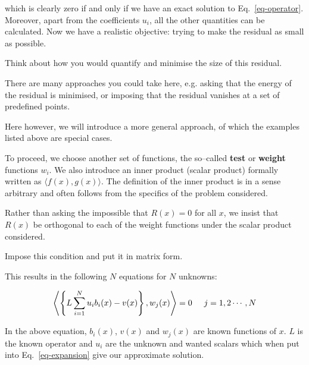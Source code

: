which is clearly zero if and only if we have an exact solution to Eq.~\ref{eq-operator}. Moreover, apart from the coefficients $u_i$, all the other quantities can be calculated. Now we have a realistic objective: trying to make the residual as small as possible.

\begin{cue}
Think about how you would quantify and minimise the size of this residual. 
\end{cue}

There are many approaches you could take here, e.g. asking that the energy of the residual is minimised, or imposing that the residual vanishes at a set of predefined points.

Here however, we will introduce a more general approach, of which the examples listed above are special cases.

\noindent{}To proceed, we choose another set of functions, the so--called \textbf{test} or \textbf{weight} functions $w_i$. We also introduce an inner product (scalar product) formally written as $\langle f(x),g(x) \rangle$. The definition of the inner product is in a sense arbitrary and often follows from the specifics of the problem considered.

Rather than asking the impossible that $R(x)=0$ for all $x$, we insist that $R(x)$ be orthogonal to each of the weight functions under the scalar product considered.

\begin{cue}
Impose this condition and put it in matrix form.  
\end{cue}

This results in the following $N$ equations for $N$ unknowns:

\begin{equation}
\left\langle \left\{ L \sum_{i=1}^N u_i b_i(x) - v(x)  \right\}, w_j(x) \right\rangle = 0 \hspace{0.5cm} j=1,2\cdots,N \label{eq-weighted-res}
\end{equation}

In the above equation, $b_i(x)$, $v(x)$ and $w_j(x)$ are known functions of $x$. $L$ is the known operator and $u_i$ are the unknown and wanted scalars which when put into Eq.~\ref{eq-expansion} give our approximate solution.

